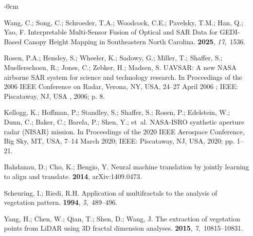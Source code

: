 \documentclass[remotesensing,article,accept,pdftex,moreauthors]{Definitions/mdpi}
\renewcommand{\hl}[1]{#1}
\begin{document}
\begin{adjustwidth}{-\extralength}{0cm}
\begin{thebibliography}{999}
Wang, C.; Song, C.; Schroeder, T.A.; Woodcock, C.E.; Pavelsky, T.M.; Han, Q.;
  Yao, F.
\newblock Interpretable Multi-Sensor Fusion of Optical and SAR Data for
  GEDI-Based Canopy Height Mapping in Southeastern North Carolina.
 {\bf 2025}, {\em 17},~1536.

Rosen, P.A.; Hensley, S.; Wheeler, K.; Sadowy, G.; Miller, T.; Shaffer, S.;
  Muellerschoen, R.; Jones, C.; Zebker, H.; Madsen, S.
\newblock UAVSAR: A new NASA airborne SAR system for science and technology
  research.
\newblock In Proceedings of the 2006 IEEE Conference on Radar, \hl{Verona, NY, USA, 24--27 April 2006}%
; IEEE: \hl{Piscataway, NJ, USA}%
, 2006; p. 8.

Kellogg, K.; Hoffman, P.; Standley, S.; Shaffer, S.; Rosen, P.; Edelstein, W.;
  Dunn, C.; Baker, C.; Barela, P.; Shen, Y.;  et~al.
\newblock NASA-ISRO synthetic aperture radar (NISAR) mission.
\newblock In Proceedings of the 2020 IEEE Aerospace Conference, \hl{Big Sky, MT, USA, 7--14 March 2020}; IEEE: \hl{Piscataway, NJ, USA}, 2020;
  pp. 1--21.

Bahdanau, D.; Cho, K.; Bengio, Y.
\newblock Neural machine translation by jointly learning to align and
  translate.
 {\bf 2014}, arXiv:1409.0473.

Scheuring, I.; Riedi, R.H.
\newblock Application of multifractals to the analysis of vegetation pattern.
 {\bf 1994}, {\em 5},~489--496.

Yang, H.; Chen, W.; Qian, T.; Shen, D.; Wang, J.
\newblock The extraction of vegetation points from LiDAR using 3D fractal
  dimension analyses.
 {\bf 2015}, {\em 7},~10815--10831.


\end{thebibliography}
\end{adjustwidth}
\end{document}
